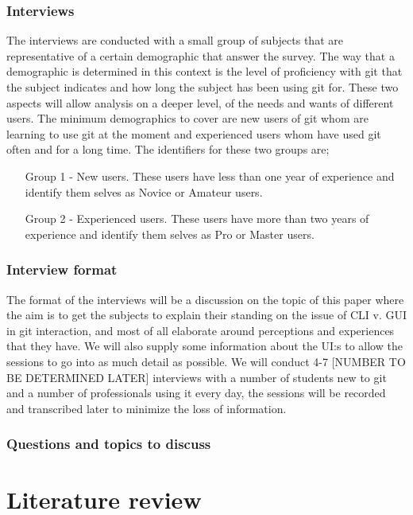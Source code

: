\documentclass[12pt,a4paper,article,compsoc]{IEEEtran}
\begin{document}
				\subsubsection{Interviews}
				The interviews are conducted with a small group of subjects that are representative of a certain demographic that answer the survey. The way that a demographic is determined in this context is the level of proficiency with git that the subject indicates and how long the subject has been using git for. 
				These two aspects will allow analysis on a deeper level, of the needs and wants of different users. The minimum demographics to cover are new users of git whom are learning to use git at the moment and experienced users whom have used git often and for a long time. The identifiers for these two groups are;
				\begin{itemize}
					\item[Group 1 - New users.]
					These users have less than one year of experience and identify them selves as Novice or Amateur users.
					\item[Group 2 - Experienced users.]
					These users have more than two years of experience and identify them selves as Pro or Master users.
				\end{itemize}
				\subsubsection*{Interview format}
				The format of the interviews will be a discussion on the topic of this paper where the aim is to get the subjects to explain their standing on the issue of CLI v. GUI in git interaction, and most of all elaborate around perceptions and experiences that they have. We will also supply some information about the UI:s to allow the sessions to go into as much detail as possible. 
				We will conduct 4-7 [NUMBER TO BE DETERMINED LATER] interviews with a number of students new to git and a number of professionals using it every day, the sessions will be recorded and transcribed later to minimize the loss of information.
					
				\subsubsection*{Questions and topics to discuss}
		
		\section{Literature review}
		
\end{document}

